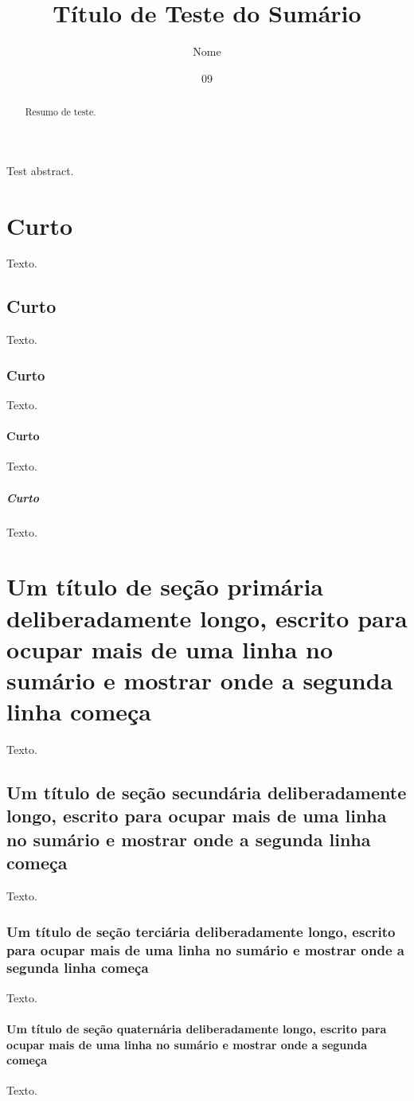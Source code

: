 \documentclass[dsc]{ufrj}
\title{Título de Teste do Sumário}
\author{Nome}{de Teste}
\date{09}{2026}
\begin{document}
  \maketitle
  \frontmatter
  \begin{abstract}
    Resumo de teste.
  \end{abstract}
  \begin{foreignabstract}
    Test abstract.
  \end{foreignabstract}
  \tableofcontents
  \mainmatter

  \chapter{Curto}
    Texto.
  \section{Curto}
    Texto.
  \subsection{Curto}
    Texto.
  \subsubsection{Curto}
    Texto.
  \paragraph{Curto}
    Texto.

  \chapter{Um título de seção primária deliberadamente longo, escrito para
    ocupar mais de uma linha no sumário e mostrar onde a segunda linha começa}
    Texto.
  \section{Um título de seção secundária deliberadamente longo, escrito para
    ocupar mais de uma linha no sumário e mostrar onde a segunda linha começa}
    Texto.
  \subsection{Um título de seção terciária deliberadamente longo, escrito para
    ocupar mais de uma linha no sumário e mostrar onde a segunda linha começa}
    Texto.
  \subsubsection{Um título de seção quaternária deliberadamente longo, escrito
    para ocupar mais de uma linha no sumário e mostrar onde a segunda começa}
    Texto.
\end{document}

